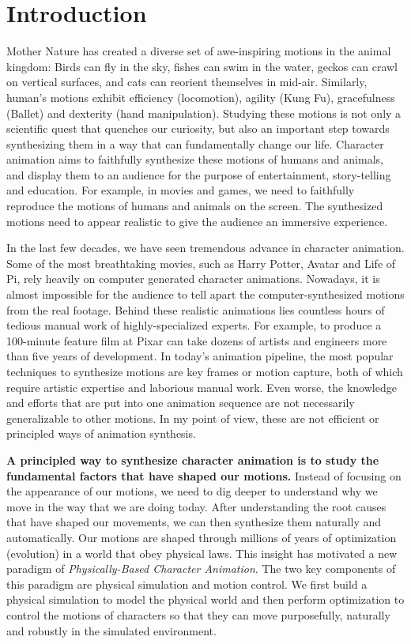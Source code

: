 \section{Introduction}

Mother Nature has created a diverse set of awe-inspiring motions in the animal kingdom: Birds can fly in the sky, fishes can swim in the water, geckos can crawl on vertical surfaces, and cats can reorient themselves in mid-air. Similarly, human's motions exhibit efficiency (locomotion), agility (Kung Fu), gracefulness (Ballet) and dexterity (hand manipulation). Studying these motions is not only a scientific quest that quenches our curiosity, but also an important step towards synthesizing them in a way that can fundamentally change our life. Character animation aims to faithfully synthesize these motions of humans and animals, and display them to an audience for the purpose of entertainment, story-telling and education. For example, in movies and games, we need to faithfully reproduce the motions of humans and animals on the screen. The synthesized motions need to appear realistic to give the audience an immersive experience. 

In the last few decades, we have seen tremendous advance in character animation. Some of the most breathtaking movies, such as Harry Potter, Avatar and Life of Pi, rely heavily on computer generated character animations. Nowadays, it is almost impossible for the audience to tell apart the computer-synthesized motions from the real footage. Behind these realistic animations lies countless hours of tedious manual work of highly-specialized experts. For example, to produce a 100-minute feature film at Pixar can take dozens of artists and engineers more than five years of development. In today's animation pipeline, the most popular techniques to synthesize motions are key frames or motion capture, both of which require artistic expertise and laborious manual work. Even worse, the knowledge and efforts that are put into one animation sequence are not necessarily generalizable to other motions. In my point of view, these are not efficient or principled ways of animation synthesis.

\textbf{A principled way to synthesize character animation is to study the fundamental factors that have shaped our motions.} Instead of focusing on the appearance of our motions, we need to dig deeper to understand why we move in the way that we are doing today. After understanding the root causes that have shaped our movements, we can then synthesize them naturally and automatically. Our motions are shaped through millions of years of optimization (evolution) in a world that obey physical laws. This insight has motivated a new paradigm of \emph{Physically-Based Character Animation}. The two key components of this paradigm are physical simulation and motion control. We first build a physical simulation to model the physical world and then perform optimization to control the motions of characters so that they can move purposefully, naturally and robustly in the simulated environment. 

